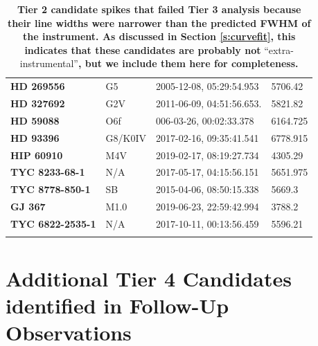 \documentclass[linenumbers]{aastex701}
\providecommand{\DIFadd}[1]{{\bf #1}} %
\providecommand{\DIFaddbegin}{} %
\providecommand{\DIFaddend}{} %
\begin{document}
\begin{longtable}{|l|l|l|l|}
  \DIFaddbegin \DIFadd{HD 269556 }\DIFaddend & G5 & 2005-12-08, 05:29:54.953 & 5706.42  \\
  \DIFaddbegin \DIFadd{HD 327692 }\DIFaddend & G2V & 2011-06-09, 04:51:56.653. & 5821.82  \\
  \DIFaddbegin \DIFadd{HD 59088 }\DIFaddend & O6f & 006-03-26, 00:02:33.378 & 6164.725  \\
  \DIFaddbegin \DIFadd{HD 93396 }\DIFaddend & G8/K0IV & 2017-02-16, 09:35:41.541 & 6778.915  \\
  \DIFaddbegin \DIFadd{HIP 60910 }\DIFaddend & M4V & 2019-02-17, 08:19:27.734 & 4305.29  \\
  \DIFaddbegin \DIFadd{TYC 8233-68-1 }\DIFaddend & N/A & 2017-05-17, 04:15:56.151 & 5651.975  \\
  \DIFaddbegin \DIFadd{TYC 8778-850-1 }\DIFaddend & SB & 2015-04-06, 08:50:15.338 & 5669.3  \\
  \DIFaddbegin \DIFadd{GJ 367 }\DIFaddend & M1.0 & 2019-06-23, 22:59:42.994 & 3788.2  \\
  \DIFaddbegin \DIFadd{TYC 6822-2535-1 }\DIFaddend & N/A & 2017-10-11, 00:13:56.459 & 5596.21  \\
\hline
 \DIFaddbegin \caption{\DIFadd{Tier 2 candidate spikes that failed Tier 3 analysis because their line widths were narrower than the predicted FWHM of the instrument. As discussed in Section \ref{s:curvefit}, this indicates that these candidates are probably not }\enquote{extra-instrumental}\DIFadd{, but we include them here for completeness.}} 
\DIFaddend \end{longtable}
\onecolumngrid
 \DIFaddbegin \clearpage
\DIFaddend 

\section{Additional Tier 4 Candidates identified in Follow-Up Observations}
\label{s:repeat_candidates}
\end{document}
